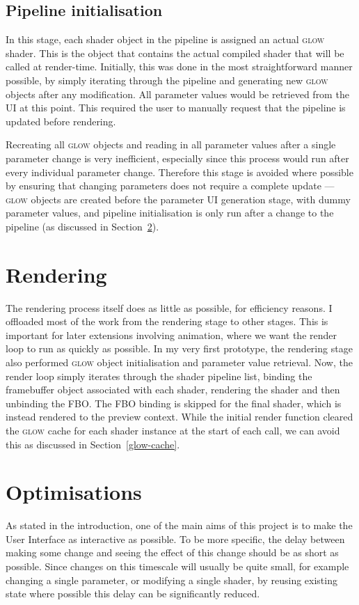 \documentclass[12pt,twoside,notitlepage]{report}
\begin{document}
\subsection*{Pipeline initialisation}
\label{pipe-init}
In this stage, each shader object in the pipeline is assigned an actual \textsc{glow} shader. This is the object that contains the actual compiled shader that will be called at render-time. Initially, this was done in the most straightforward manner possible, by simply iterating through the pipeline and generating new \textsc{glow} objects after any modification. All parameter values would be retrieved from the UI at this point. This required the user to manually request that the pipeline is updated before rendering. 

Recreating all \textsc{glow} objects and reading in all parameter values after a single parameter change is very inefficient, especially since this process would run after every individual parameter change. Therefore this stage is avoided where possible by ensuring that changing parameters does not require a complete update --- \textsc{glow} objects are created before the parameter UI generation stage, with dummy parameter values, and pipeline initialisation is only run after a change to the pipeline (as discussed in Section~\ref{opt}).

\section{Rendering}
The rendering process itself does as little as possible, for efficiency reasons. I offloaded most of the work from the rendering stage to other stages. This is important for later extensions involving animation, where we want the render loop to run as quickly as possible. In my very first prototype, the rendering stage also performed \textsc{glow} object initialisation and parameter value retrieval. Now, the render loop simply iterates through the shader pipeline list, binding the framebuffer object associated with each shader, rendering the shader and then unbinding the FBO. The FBO binding is skipped for the final shader, which is instead rendered to the preview context. While the initial render function cleared the \textsc{glow} cache for each shader instance at the start of each call, we can avoid this as discussed in Section~\ref{glow-cache}.

\clearpage
\section{Optimisations}
\label{opt}
As stated in the introduction, one of the main aims of this project is to make the User Interface as interactive as possible. To be more specific, the delay between making some change and seeing the effect of this change should be as short as possible. Since changes on this timescale will usually be quite small, for example changing a single parameter, or modifying a single shader, by reusing existing state where possible this delay can be significantly reduced.
\end{document}
